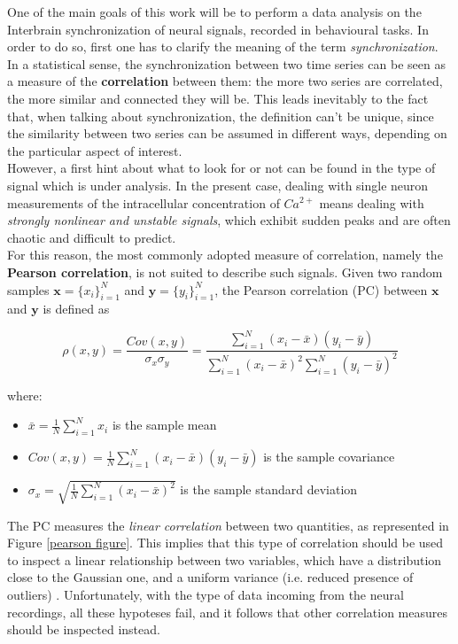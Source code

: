 \documentclass[12pt, a4paper]{report}
\begin{document}
One of the main goals of this work will be to perform a data analysis on the Interbrain synchronization of neural signals, recorded in behavioural tasks. In order to do so, first one has to clarify the meaning of the term  \textit{synchronization}.\\
In a statistical sense, the synchronization between two time series can be seen as a measure of the \textbf{correlation} between them: the more two series are correlated, the more similar and connected they will be. This leads inevitably to the fact that, when talking about synchronization, the definition can't be unique, since the similarity between two series can be assumed in different ways, depending on the particular aspect of interest. \\
However, a first hint about what to look for or not can be found in the type of signal which is under analysis. In the present case, dealing with single neuron measurements of the intracellular concentration of $Ca^{2+}$ means dealing with \textit{strongly nonlinear and unstable signals}, which exhibit sudden peaks and are often chaotic and difficult to predict.\\
For this reason, the most commonly adopted measure of correlation, namely the \textbf{Pearson correlation}, is not suited to describe such signals. Given two random samples $ \textbf{x} = \{x_i\}_{i=1}^N$ and  $ \textbf{y} = \{y_i\}_{i=1}^N$, the Pearson correlation (PC) between  $ \textbf{x}$ and  $ \textbf{y}$ is defined as

\begin{equation}
	 \rho(x,y) = \frac{Cov(x,y)}{\sigma_x \sigma_y} = \frac{\sum_{i=1}^{N}(x_i-\bar{x}) (y_i-\bar{y})} {\sum_{i=1}^{N}(x_i-\bar{x})^2 \sum_{i=1}^{N} (y_i-\bar{y})^2} \label{pearson}
\end{equation}


where:
\begin{itemize}
	\item $ \bar{x} = \frac{1}{N}\sum_{i=1}^{N}x_i$ is the sample mean
	
	\item $Cov(x,y) = \frac{1}{N}\sum_{i=1}^{N}(x_i-\bar{x}) (y_i-\bar{y})$ is the sample covariance
	
	\item $\sigma_x = \sqrt{\frac{1}{N}\sum_{i=1}^{N}(x_i-\bar{x})^2}$ is the sample standard deviation
\end{itemize}

The PC measures the \textit{linear correlation} between two quantities, as represented in Figure \ref{pearson figure}. This implies that this type of correlation should be used to inspect a linear relationship between two variables, which have a distribution close to the Gaussian one, and a uniform variance (i.e. reduced presence of outliers) \cite{17}. %
 Unfortunately, with the type of data incoming from the neural recordings, all these hypoteses fail, and it follows that other correlation measures should be inspected instead.
\end{document}
